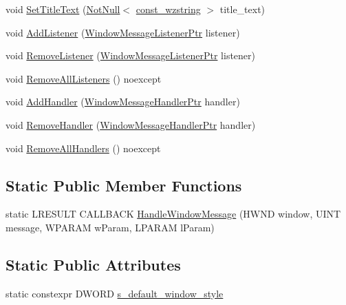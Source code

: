 \begin{DoxyCompactItemize}
\item 
void \hyperlink{classmage_1_1_window_a7f5e2e528eb26bf6750131a1d72db28e}{Set\+Title\+Text} (\hyperlink{namespacemage_a8769f9d670d6b585ea306cb1062af94b}{Not\+Null}$<$ \hyperlink{namespacemage_ac409e0f2a22292a3a4cd42742994fbf0}{const\+\_\+wzstring} $>$ title\+\_\+text)
\item 
void \hyperlink{classmage_1_1_window_ac6020962e1fd29118675207bde5d216d}{Add\+Listener} (\hyperlink{classmage_1_1_window_a0e0a4f2a3f6db176f6aec454b94a06fb}{Window\+Message\+Listener\+Ptr} listener)
\item 
void \hyperlink{classmage_1_1_window_a0f30903e406cf3cde3682befafcd3eba}{Remove\+Listener} (\hyperlink{classmage_1_1_window_a0e0a4f2a3f6db176f6aec454b94a06fb}{Window\+Message\+Listener\+Ptr} listener)
\item 
void \hyperlink{classmage_1_1_window_a1bb37381e94c541027d1ee4da7f6c7e2}{Remove\+All\+Listeners} () noexcept
\item 
void \hyperlink{classmage_1_1_window_ae33b5ea74354830278c9ee130fa917c7}{Add\+Handler} (\hyperlink{classmage_1_1_window_add1d792fb9f71e70d4fb07409d80cfdd}{Window\+Message\+Handler\+Ptr} handler)
\item 
void \hyperlink{classmage_1_1_window_a81b23a696f73636ec9aa985ceda391b4}{Remove\+Handler} (\hyperlink{classmage_1_1_window_add1d792fb9f71e70d4fb07409d80cfdd}{Window\+Message\+Handler\+Ptr} handler)
\item 
void \hyperlink{classmage_1_1_window_a9b1efac3d0bd27df4e33ab704bc59f98}{Remove\+All\+Handlers} () noexcept
\end{DoxyCompactItemize}
\subsection*{Static Public Member Functions}
\begin{DoxyCompactItemize}
\item 
static L\+R\+E\+S\+U\+LT C\+A\+L\+L\+B\+A\+CK \hyperlink{classmage_1_1_window_a1bd8a958bb5e15f22982a74a513a715e}{Handle\+Window\+Message} (H\+W\+ND window, U\+I\+NT message, W\+P\+A\+R\+AM w\+Param, L\+P\+A\+R\+AM l\+Param)
\end{DoxyCompactItemize}
\subsection*{Static Public Attributes}
\begin{DoxyCompactItemize}
\item 
static constexpr D\+W\+O\+RD \hyperlink{classmage_1_1_window_ac680bdd3d5359f66b2dea082ef45e0da}{s\+\_\+default\+\_\+window\+\_\+style}
\end{DoxyCompactItemize}
